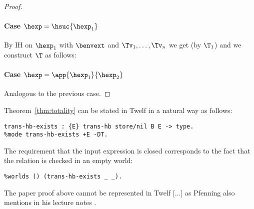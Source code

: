 \begin{proof}
\paragraph{Case $\hexp = \hsuc{\hexp_1}$}
By IH on $\hexp_1$ with $\benvext$ and $\Tv_1, \ldots, \Tv_n$ we get  (by $\T_1$) and we construct $\T$ as follows:
\begin{prooftree}
\end{prooftree}

\paragraph{Case $\hexp = \app{\hexp_1}{\hexp_2}$}
Analogous to the previous case.

\end{proof}

\Twelf
Theorem~\ref{thm:totality} can be stated in Twelf in a natural way as follows:
\begin{verbatim}
trans-hb-exists : {E} trans-hb store/nil B E -> type.
%mode trans-hb-exists +E -DT.
\end{verbatim}
The requirement that the input \hlang expression is closed corresponds to the fact that the relation is checked in an empty world:
\begin{verbatim}
%worlds () (trans-hb-exists _ _).
\end{verbatim}

The paper proof above cannot be represented in Twelf [...] as Pfenning also mentions in his lecture notes \cite{Pfenning01}.




